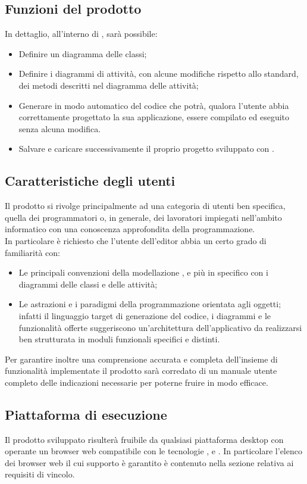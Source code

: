 	\subsection{Funzioni del prodotto}
	In dettaglio, all'interno di \proj{}, sarà possibile:
	\begin{itemize}
	\item Definire un diagramma delle classi;
	\item Definire i diagrammi di attività, con alcune modifiche rispetto allo standard, dei metodi descritti nel diagramma delle attività;
	\item Generare in modo automatico del codice che potrà, qualora l'utente abbia correttamente progettato la sua applicazione, essere compilato ed eseguito senza alcuna modifica.
	\item Salvare e caricare successivamente il proprio progetto sviluppato con \proj.
	\end{itemize}
	\subsection{Caratteristiche degli utenti}
	Il prodotto \proj{} si rivolge principalmente ad una categoria di utenti ben specifica, quella dei programmatori o, in generale, dei lavoratori impiegati nell'ambito informatico con una conoscenza approfondita della programmazione.
	\\In particolare è richiesto che l'utente dell'editor abbia un certo grado di familiarità con:
		\begin{itemize}
			\item Le principali convenzioni della modellazione , e più in specifico con i diagrammi delle classi e delle attività;
			\item Le astrazioni e i paradigmi della programmazione orientata agli oggetti; infatti il linguaggio target di generazione del codice, i diagrammi e le funzionalità offerte suggeriscono un'architettura dell'applicativo da realizzarsi ben strutturata in moduli funzionali specifici e distinti.
		\end{itemize} 
	Per garantire inoltre una comprensione accurata e completa dell'insieme di funzionalità implementate il prodotto sarà corredato di un manuale utente completo delle indicazioni necessarie per poterne fruire in modo efficace.
	\subsection{Piattaforma di esecuzione}
	Il prodotto sviluppato risulterà fruibile da qualsiasi piattaforma desktop con operante un browser web compatibile con le tecnologie ,  e . In particolare l'elenco dei browser web il cui supporto è garantito è contenuto nella sezione relativa ai requisiti di vincolo.

